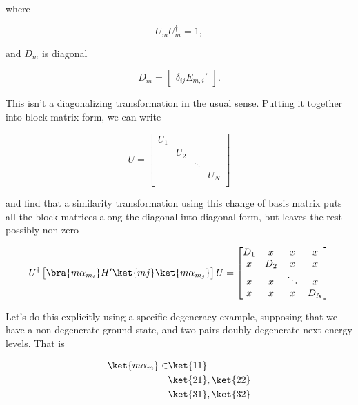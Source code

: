 where

\begin{equation}\label{eqn:pertubationDegeneracy:190}
U_m U_m^\dagger = 1,
\end{equation}

and $D_m$ is diagonal

\begin{equation}\label{eqn:pertubationDegeneracy:210}
D_m = 
\begin{bmatrix}
\delta_{ij} E_{m,i}'
\end{bmatrix}.
\end{equation}

This isn't a diagonalizing transformation in the usual sense.  Putting it together into block matrix form, we can write

\begin{equation}\label{eqn:pertubationDegeneracy:230}
U = 
\begin{bmatrix}
U_1 &   	&  	 & \\
    & U_2 	&  	 & \\
    &     	& \ddots & \\
    &     	&        & U_N \\
\end{bmatrix}
\end{equation}

and find that a similarity transformation using this change of basis matrix puts all the block matrices along the diagonal into diagonal form, but leaves the rest possibly non-zero

\begin{equation}\label{eqn:pertubationDegeneracy:250}
U^\dagger
\begin{bmatrix}
\bra{m \alpha_{m_i}} H' \ket{m j} \ket{m \alpha_{m_j}}
\end{bmatrix}
U
=
\begin{bmatrix}
D_1 & x 	& x	 & x \\
 x  & D_2 	& x	 & x \\
 x  & x   	& \ddots & x \\
 x  & x   	& x      & D_N \\
\end{bmatrix}
\end{equation}

Let's do this explicitly using a specific degeneracy example, supposing that we have a non-degenerate ground state, and two pairs doubly degenerate next energy levels.  That is

\begin{equation}\label{eqn:pertubationDegeneracy:270}
\begin{aligned}
\ket{m \alpha_m} \in 
&\ket{11} \\
&\ket{21}, \ket{22} \\
&\ket{31}, \ket{32} 
\end{aligned}
\end{equation}

